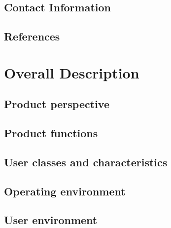 \documentclass[10pt]{article}
\begin{document}
\lipsum[10]

\subsection{Contact Information}

\lipsum[10]

\subsection{References}

\lipsum[10]








\section{Overall Description}

\subsection{Product perspective}

\lipsum[10]

\subsection{Product functions}

\lipsum[10]

\subsection{User classes and characteristics}

\lipsum[10]

\subsection{Operating environment}

\lipsum[10]

\subsection{User environment}
\end{document}
